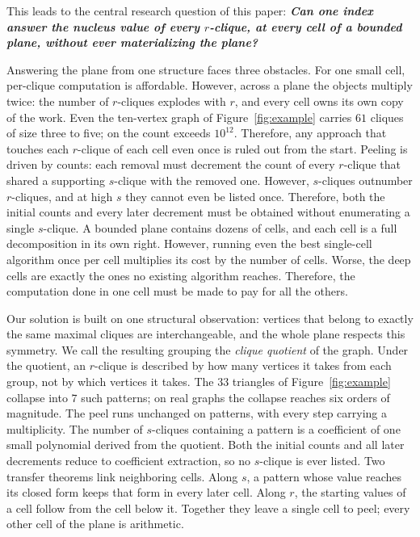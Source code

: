 This leads to the central research question of this paper: \textbf{\textit{Can one index answer the nucleus value of every $r$-clique, at every cell of a bounded plane, without ever materializing the plane?}}

Answering the plane from one structure faces three obstacles.
%
For one small cell, per-clique computation is affordable.
%
However, across a plane the objects multiply twice: the number of $r$-cliques explodes with $r$, and every cell owns its own copy of the work.
%
Even the ten-vertex graph of Figure~\ref{fig:example} carries $61$ cliques of size three to five; on \webit{} the count exceeds $10^{12}$.
%
Therefore, any approach that touches each $r$-clique of each cell even once is ruled out from the start.
%
Peeling is driven by counts: each removal must decrement the count of every $r$-clique that shared a supporting $s$-clique with the removed one.
%
However, $s$-cliques outnumber $r$-cliques, and at high $s$ they cannot even be listed once.
%
Therefore, both the initial counts and every later decrement must be obtained without enumerating a single $s$-clique.
%
A bounded plane contains dozens of cells, and each cell is a full decomposition in its own right.
%
However, running even the best single-cell algorithm once per cell multiplies its cost by the number of cells.
%
Worse, the deep cells are exactly the ones no existing algorithm reaches.
%
Therefore, the computation done in one cell must be made to pay for all the others.

Our solution is built on one structural observation: vertices that belong to exactly the same maximal cliques are interchangeable, and the whole plane respects this symmetry.
%
We call the resulting grouping the \textit{clique quotient} of the graph.
%
Under the quotient, an $r$-clique is described by how many vertices it takes from each group, not by which vertices it takes.
%
The $33$ triangles of Figure~\ref{fig:example} collapse into $7$ such patterns; on real graphs the collapse reaches six orders of magnitude.
%
The peel runs unchanged on patterns, with every step carrying a multiplicity.
%
The number of $s$-cliques containing a pattern is a coefficient of one small polynomial derived from the quotient.
%
Both the initial counts and all later decrements reduce to coefficient extraction, so no $s$-clique is ever listed.
%
Two transfer theorems link neighboring cells.
%
Along $s$, a pattern whose value reaches its closed form keeps that form in every later cell.
%
Along $r$, the starting values of a cell follow from the cell below it.
%
Together they leave a single cell to peel; every other cell of the plane is arithmetic.

